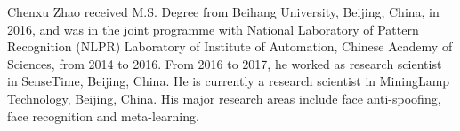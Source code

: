 \documentclass[10pt,journal,compsoc]{IEEEtran}
\begin{document}
	
\begin{IEEEbiography}{Chenxu Zhao}
received M.S. Degree from Beihang University, Beijing, China, in 2016, and was in the joint programme with National Laboratory of Pattern Recognition (NLPR) Laboratory of Institute of Automation, Chinese Academy of Sciences, from 2014 to 2016.
From 2016 to 2017, he worked as research scientist in SenseTime, Beijing, China. 
He is currently a research scientist in MiningLamp Technology, Beijing, China. 
His major research areas include face anti-spoofing, face recognition and meta-learning.
\end{IEEEbiography}



	

	
\end{document}
